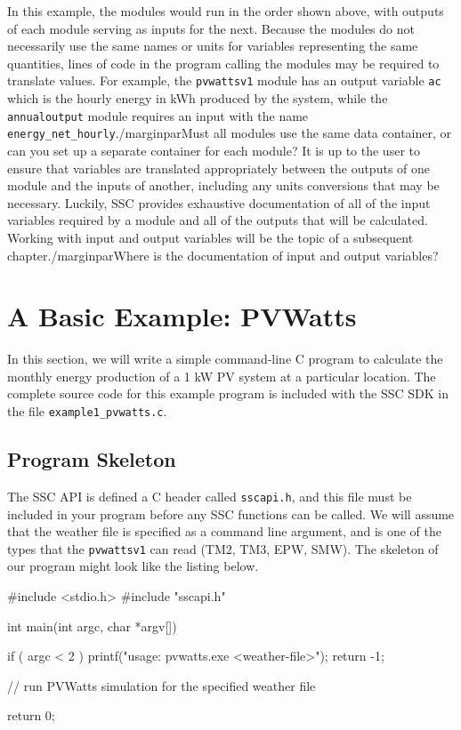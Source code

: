 \documentclass{article}
\begin{document}
In this example, the modules would run in the order shown above, with outputs of each module serving as inputs for the next. Because the modules do not necessarily use the same names or units for variables representing the same quantities, lines of code in the program calling the modules may be required to translate values.  For example, the \texttt{pvwattsv1} module has an output variable \texttt{ac} which is the hourly energy in kWh produced by the system, while the \texttt{annualoutput} module requires an input with the name \texttt{energy\_net\_hourly}./marginpar{Must all modules use the same data container, or can you set up a separate container for each module?}  It is up to the user to ensure that variables are translated appropriately between the outputs of one module and the inputs of another, including any units conversions that may be necessary.  Luckily, SSC provides exhaustive documentation of all of the input variables required by a module and all of the outputs that will be calculated.  Working with input and output variables will be the topic of a subsequent chapter./marginpar{Where is the documentation of input and output variables?}

\section{A Basic Example: PVWatts}

In this section, we will write a simple command-line C program to calculate the monthly energy production of a 1 kW PV system at a particular location.  The complete source code for this example program is included with the SSC SDK in the file \texttt{example1\_pvwatts.c}.

\subsection{Program Skeleton}

The SSC API is defined a C header called \texttt{sscapi.h}, and this file must be included in your program before any SSC functions can be called.  We will assume that the weather file is specified as a command line argument, and is one of the types that the \texttt{pvwattsv1} can read (TM2, TM3, EPW, SMW).  The skeleton of our program might look like the listing below.

\begin{verbatimtab}[4]
#include <stdio.h>
#include "sscapi.h"

int main(int argc, char *argv[])
{
	if ( argc < 2 )
	{
		printf("usage: pvwatts.exe <weather-file>\n");
		return -1;
	}
 
	// run PVWatts simulation for the specified weather file
	
	return 0;
}
\end{verbatimtab}
\end{document}
